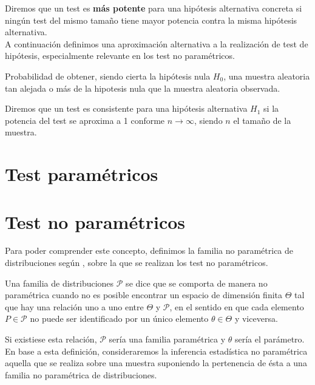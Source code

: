 	Diremos que un test es \textbf{más potente} para una hipótesis alternativa concreta si ningún test del mismo tamaño tiene mayor potencia contra la misma hipótesis alternativa.\\
	A continuación definimos una aproximación alternativa a la realización de test de hipótesis, especialmente relevante en los test no paramétricos. 
	
\begin{definicion}[$p$-valor]
	Probabilidad de obtener, siendo cierta la hipótesis nula $H_0$, una muestra aleatoria tan alejada o más de la hipotesis nula que la muestra aleatoria observada.
\end{definicion}

\begin{definicion}[Consistencia]
	Diremos que un test es consistente para una hipótesis alternativa $H_1$ si la potencia del test se aproxima a 1 conforme $n \rightarrow \infty$, siendo $n$ el tamaño de la muestra.
\end{definicion}
	
	
\section{Test paramétricos}

\section{Test no paramétricos}

	Para poder comprender este concepto, definimos la familia no paramétrica de distribuciones según \cite{PESSAL10}, sobre la que se realizan los test no paramétricos.
 
\begin{definicion}
	Una familia de distribuciones $\mathcal{P}$ se dice que se comporta de manera no paramétrica cuando no es posible encontrar un espacio de dimensión finita $\Theta$ tal que hay una relación uno a uno entre $\Theta$ y $\mathcal{P}$, en el sentido en que cada elemento $P \in \mathcal{P}$ no puede ser identificado por un único elemento $\theta \in \Theta$ y viceversa.
\end{definicion}

	Si existiese esta relación, $\mathcal{P}$ sería una familia paramétrica y $\theta$ sería el parámetro.\\
	En base a esta definición, consideraremos la inferencia estadística no paramétrica aquella que se realiza sobre una muestra suponiendo la pertenencia de ésta a una familia no paramétrica de distribuciones.
	
